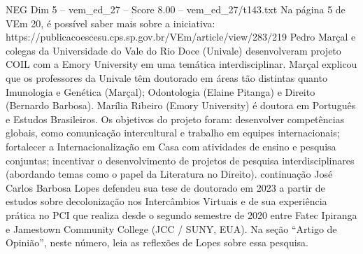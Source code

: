 \begin{textsample}{NEG Dim 5 – vem\_ed\_27 – Score 8.00 – vem\_ed\_27/t143.txt}
Na página 5 de VEm 20, é possível saber mais sobre a iniciativa: https://publicacoescesu.cps.sp.gov.br/VEm/article/view/283/219 Pedro Marçal e colegas da Universidade do Vale do Rio Doce (Univale) desenvolveram projeto COIL com a Emory University em uma temática interdisciplinar.
Marçal explicou que os professores da Univale têm doutorado em áreas tão distintas quanto Imunologia e Genética (Marçal); Odontologia (Elaine Pitanga) e Direito (Bernardo Barbosa).
Marília Ribeiro (Emory University) é doutora em Português e Estudos Brasileiros.
Os objetivos do projeto foram: desenvolver competências globais, como comunicação intercultural e trabalho em equipes internacionais; fortalecer a Internacionalização em Casa com atividades de ensino e pesquisa conjuntas; incentivar o desenvolvimento de projetos de pesquisa interdisciplinares (abordando temas como o papel da Literatura no Direito). continuação José Carlos Barbosa Lopes defendeu sua tese de doutorado em 2023 a partir de estudos sobre decolonização nos Intercâmbios Virtuais e de sua experiência prática no PCI que realiza desde o segundo semestre de 2020 entre Fatec Ipiranga e Jamestown Community College (JCC / SUNY, EUA).
Na seção “Artigo de Opinião”, neste número, leia as reflexões de Lopes sobre essa pesquisa.

\end{textsample}
